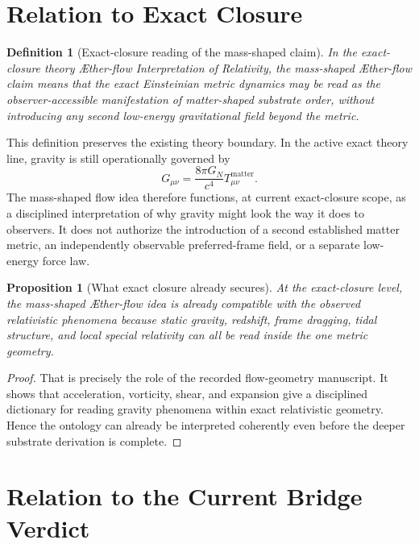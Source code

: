 \documentclass[11pt]{article}
\newcommand{\Aflow}{\AE{}ther-flow}
\newcommand{\TheoryName}{\Aflow{} Interpretation of Relativity}
\newtheorem{definition}{Definition}
\newtheorem{proposition}{Proposition}
\begin{document}
\section{Relation to Exact Closure}

\begin{definition}[Exact-closure reading of the mass-shaped claim]
In the exact-closure theory \TheoryName{}, the mass-shaped \Aflow{} claim means that the exact Einsteinian metric dynamics may be read as the observer-accessible manifestation of matter-shaped substrate order, without introducing any second low-energy gravitational field beyond the metric.
\end{definition}

This definition preserves the existing theory boundary. In the active exact theory line, gravity is still operationally governed by
\begin{equation}
G_{\mu\nu}
=
\frac{8\pi G_N}{c^4}T_{\mu\nu}^{\mathrm{matter}}.
\label{eq:einstein}
\end{equation}
The mass-shaped flow idea therefore functions, at current exact-closure scope, as a disciplined interpretation of why gravity might look the way it does to observers. It does not authorize the introduction of a second established matter metric, an independently observable preferred-frame field, or a separate low-energy force law.

\begin{proposition}[What exact closure already secures]
At the exact-closure level, the mass-shaped \Aflow{} idea is already compatible with the observed relativistic phenomena because static gravity, redshift, frame dragging, tidal structure, and local special relativity can all be read inside the one metric geometry.
\end{proposition}

\begin{proof}
That is precisely the role of the recorded flow-geometry manuscript. It shows that acceleration, vorticity, shear, and expansion give a disciplined dictionary for reading gravity phenomena within exact relativistic geometry. Hence the ontology can already be interpreted coherently even before the deeper substrate derivation is complete.
\end{proof}

\section{Relation to the Current Bridge Verdict}
\end{document}
